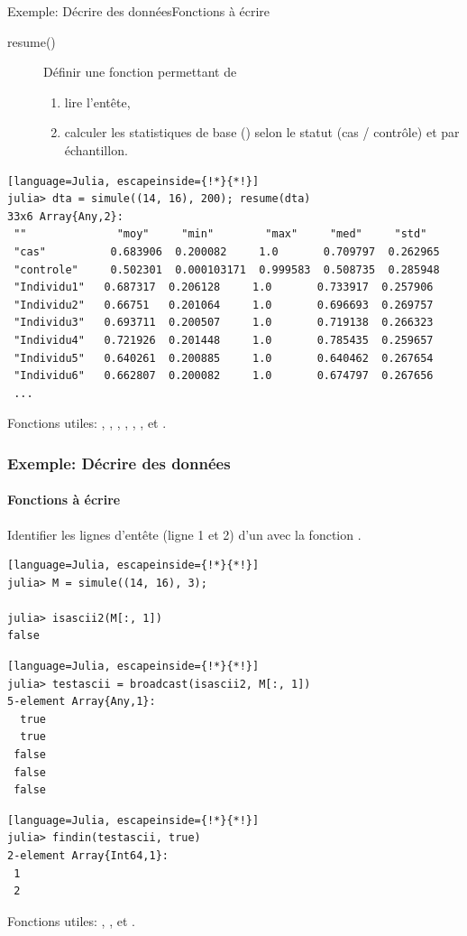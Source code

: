 \begin{frame}[containsverbatim]{\textcolor{goldenrod2}{Exemple:} Décrire des données}{Fonctions à écrire}
    \begin{description}
        \item[resume()] Définir une fonction permettant de
            \begin{enumerate}
                \item lire l'entête,
                \item calculer les statistiques de base () selon le statut (cas / contrôle) et par échantillon.
            \end{enumerate}
    \end{description}
\begin{lstlisting}[language=Julia, escapeinside={!*}{*!}]
julia> dta = simule((14, 16), 200); resume(dta)
33x6 Array{Any,2}:
 ""              "moy"     "min"        "max"     "med"     "std"
 "cas"          0.683906  0.200082     1.0       0.709797  0.262965
 "controle"     0.502301  0.000103171  0.999583  0.508735  0.285948
 "Individu1"   0.687317  0.206128     1.0       0.733917  0.257906
 "Individu2"   0.66751   0.201064     1.0       0.696693  0.269757
 "Individu3"   0.693711  0.200507     1.0       0.719138  0.266323
 "Individu4"   0.721926  0.201448     1.0       0.785435  0.259657
 "Individu5"   0.640261  0.200885     1.0       0.640462  0.267654
 "Individu6"   0.662807  0.200082     1.0       0.674797  0.267656
 ...
\end{lstlisting}
\par{Fonctions utiles: , , , , , ,  et .}
\end{frame}


\begin{frame}[fragile]
    \frametitle{\textcolor{goldenrod2}{Exemple:} Décrire des données}
    \framesubtitle{Fonctions à écrire}
    \par{Identifier les lignes d'entête (ligne 1 et 2) d'un  avec la fonction .}
\begin{lstlisting}[language=Julia, escapeinside={!*}{*!}]
julia> M = simule((14, 16), 3);

julia> isascii2(M[:, 1])
false
\end{lstlisting}
\vspace{-2ex}
\begin{lstlisting}[language=Julia, escapeinside={!*}{*!}]
julia> testascii = broadcast(isascii2, M[:, 1])
5-element Array{Any,1}:
  true
  true
 false
 false
 false
\end{lstlisting}
\vspace{-2ex}
\begin{lstlisting}[language=Julia, escapeinside={!*}{*!}]
julia> findin(testascii, true)
2-element Array{Int64,1}:
 1
 2
\end{lstlisting}
\vspace{2ex}
\par{Fonctions utiles: , ,  et .}
\end{frame}



